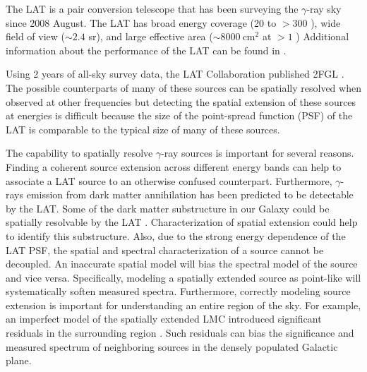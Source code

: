 \documentclass[12pt,preprint]{aastex}
\newcommand{\mev}{\text{MeV}\xspace}
\newcommand{\gev}{\text{GeV}\xspace}
\newcommand{\cm}{\text{cm}\xspace}
\begin{document}
The LAT is a pair conversion telescope that has been surveying the
$\gamma$-ray sky since 2008 August.  The LAT has broad energy coverage
(20 \mev to $>300$ \gev), wide field of view ($\sim 2.4$ sr), and large
effective area ($\sim 8000\ \cm^2$ at $>1$ \gev) 
Additional information about the performance of the LAT can be found in
\cite{atwood_LAT_mission}.

Using 2 years of all-sky survey data, the LAT Collaboration published
2FGL \citep[2FGL][]{second_cat}.
The possible counterparts of many of these sources can be spatially resolved
when observed at other frequencies but detecting the spatial extension
of these sources at \gev energies is difficult because the size of the
point-spread function (PSF) of the LAT is comparable to the typical size
of many of these sources.

The capability to spatially resolve \gev $\gamma$-ray
sources is important for several reasons.  
Finding a coherent source extension across different energy bands can
help to associate a LAT source to an otherwise confused counterpart.
Furthermore, $\gamma$-rays emission from dark matter
annihilation has been predicted to be detectable by the LAT.
Some of the dark matter substructure in our Galaxy 
could be spatially resolvable by the LAT \citep{pre_luanch_dark_matter_fermi}.  
Characterization of spatial extension could help to identify this substructure.
Also,
due to the strong energy dependence of the LAT PSF, the spatial and
spectral characterization of a source cannot be
decoupled. An inaccurate
spatial model will bias the spectral model of the source and vice versa. Specifically,
modeling a spatially extended source as point-like will systematically
soften measured spectra. Furthermore, correctly
modeling source extension is important for 
understanding an entire region of the sky. For example,
an imperfect model of the spatially extended LMC introduced
significant residuals in the surrounding region \citep{first_cat,second_cat}.
Such residuals can bias the significance and measured spectrum of
neighboring sources in the densely populated Galactic plane.
\end{document}
